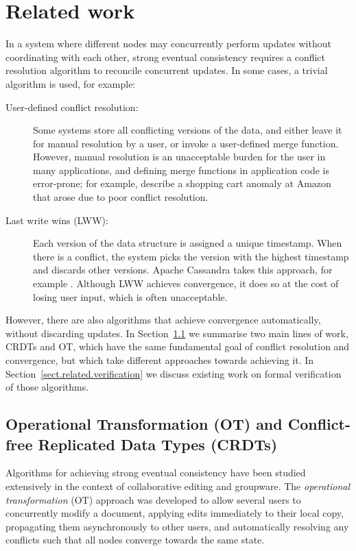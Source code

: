 \section{Related work}\label{sect.relatedwork}

In a system where different nodes may concurrently perform updates without coordinating with each other, strong eventual consistency requires a conflict resolution algorithm to reconcile concurrent updates. 
In some cases, a trivial algorithm is used, for example:
\begin{description}
\item[User-defined conflict resolution:] Some systems store all conflicting versions of the data,
and either leave it for manual resolution by a user, or invoke a user-defined merge function.
However, manual resolution is an unacceptable burden for the user in many applications, and defining
merge functions in application code is error-prone; for example, \citet{DeCandia:2007ui} describe a
shopping cart anomaly at Amazon that arose due to poor conflict resolution.

\item[Last write wins (LWW):] Each version of the data structure is assigned a unique timestamp.
When there is a conflict, the system picks the version with the highest timestamp and discards other
versions. Apache Cassandra takes this approach, for example \cite{KingsburyCassandra}.
Although LWW achieves convergence, it does so at the cost of losing user input, which is often unacceptable.
\end{description}
However, there are also algorithms that achieve convergence automatically, without discarding updates.
In Section~\ref{sect.related.ot.crdts} we summarise two main lines of work, CRDTs and OT, which have the same fundamental goal of conflict resolution and convergence, but which take different approaches towards achieving it.
In Section~\ref{sect.related.verification} we discuss existing work on formal verification of those algorithms.

\subsection{Operational Transformation (OT) and Conflict-free Replicated Data Types (CRDTs)}\label{sect.related.ot.crdts}

Algorithms for achieving strong eventual consistency have been studied extensively in the context of collaborative editing and groupware.
The \emph{operational transformation} (OT) approach was developed to allow several users to concurrently modify a document, applying edits immediately to their local copy, propagating them asynchronously to other users, and automatically resolving any conflicts such that all nodes converge towards the same state.

